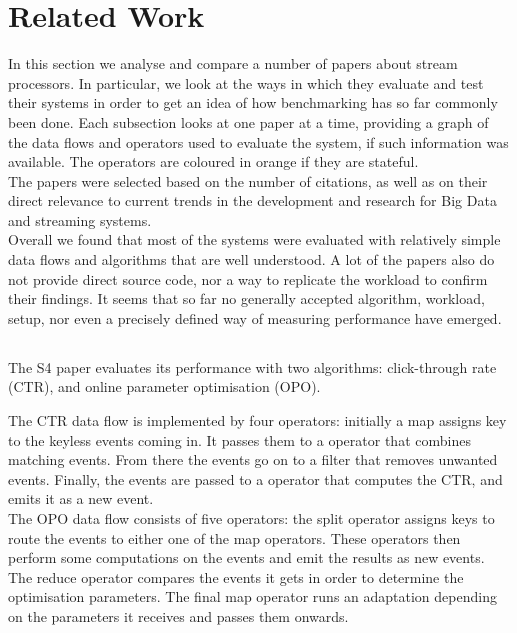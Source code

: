 \section{Related Work}
In this section we analyse and compare a number of papers about stream processors. In particular, we look at the ways in which they evaluate and test their systems in order to get an idea of how benchmarking has so far commonly been done. Each subsection looks at one paper at a time, providing a graph of the data flows and operators used to evaluate the system, if such information was available. The operators are coloured in orange if they are stateful. \\

The papers were selected based on the number of citations, as well as on their direct relevance to current trends in the development and research for Big Data and streaming systems. \\

Overall we found that most of the systems were evaluated with relatively simple data flows and algorithms that are well understood. A lot of the papers also do not provide direct source code, nor a way to replicate the workload to confirm their findings. It seems that so far no generally accepted algorithm, workload, setup, nor even a precisely defined way of measuring performance have emerged.

\subsection{}
The S4 paper\cite{s4} evaluates its performance with two algorithms: click-through rate (CTR), and online parameter optimisation (OPO). \\


The CTR data flow is implemented by four operators: initially a map assigns key to the keyless events coming in. It passes them to a operator that combines matching events. From there the events go on to a filter that removes unwanted events. Finally, the events are passed to a operator that computes the CTR, and emits it as a new event. \\

The OPO data flow consists of five operators: the split operator assigns keys to route the events to either one of the map operators. These operators then perform some computations on the events and emit the results as new events. The reduce operator compares the events it gets in order to determine the optimisation parameters. The final map operator runs an adaptation depending on the parameters it receives and passes them onwards.

